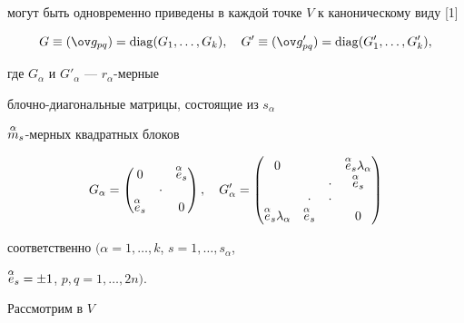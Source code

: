 могут быть одновременно приведены в каждой точке $V$ к каноническому виду [1]


\begin{equation} \label{10}


G\equiv (\ov g_{pq})=\diag(G_1,\dotsc,G_k),\quad


G'\equiv (\ov g'_{pq})=\diag(G'_1,\ldots,G'_k),


\end{equation}


где $G_{\alpha}$ и $G'_{\alpha}$ --- $r_{\alpha}$-мерные


блочно-диагональные матрицы, состоящие из $s_{\alpha}$\;


$\overset{\alpha}{m}_s$-мерных квадратных блоков


\begin{equation} \label{11}


G_{\alpha}=


\begin{pmatrix}


0 & \ & \up{\alpha}{e}_s \\


\ & \cdot & \ \\


\up{\alpha}{e}_s & \ & 0


\end{pmatrix}


,


\quad G'_{\alpha}=


\begin{pmatrix}


0 & \ & \ & \up{\alpha}{e}_s\lambda_{\alpha} \\


\ & \ & \cdot & \up{\alpha}{e}_s \\


\ & \cdot & \cdot & \ \\


\up{\alpha}{e}_s \lambda_{\alpha} &


\up{\alpha}{e}_s & \ & 0


\end{pmatrix}


\end{equation}


соответственно $(\alpha =1,\dotsc,k$, $s=1,\dotsc,s_{\alpha}$,


$\overset{\alpha}{e}_s=\pm 1$, $p,q=1,\dotsc ,2n)$.





Рассмотрим в $V$


